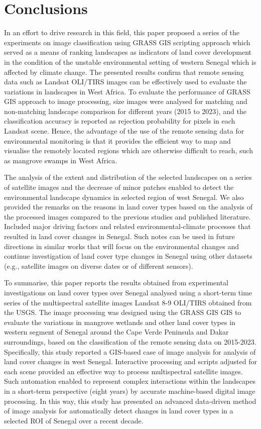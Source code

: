 \documentclass[earth,article,submit,pdftex,moreauthors]{Definitions/mdpi}
\begin{document}
\section{Conclusions}

In an effort to drive research in this field, this paper proposed a series of the experiments on image classification using GRASS GIS scripting approach which served as a means of ranking landscapes as indicators of land cover development in the condition of the unstable environmental setting of western Senegal which is affected by climate change. The presented results confirm that remote sensing data such as Landsat OLI/TIRS images can be effectively used to evaluate the variations in landscapes in West Africa. To evaluate the performance of GRASS GIS approach to image processing, size images were analysed for matching and non-matching landscape comparison for different years (2015 to 2023), and the classification accuracy is reported as rejection probability for pixels in each Landsat scene. Hence, the advantage of the use of the remote sensing data for environmental monitoring is that it provides the efficient way to map and visualise the remotely located regions which are otherwise difficult to reach, such as mangrove swamps in West Africa. 

The analysis of the extent and distribution of the selected landscapes on a series of satellite images and the decrease of minor patches enabled to detect the environmental landscape dynamics in selected region of west Senegal. We also provided the remarks on the reasons in land cover types based on the analysis of the processed images compared to the previous studies and published literature. Included major driving factors and related environmental-climate processes that resulted in land cover changes in Senegal. Such notes can be used in future directions in similar works that will focus on the environmental changes and continue investigation of land cover type changes in Senegal using other datasets (e.g., satellite images on diverse dates or of different sensors).

To summarise, this paper reports the results obtained from experimental investigations on land cover types over Senegal analysed using a short-term time series of the multispectral satellite images Landsat 8-9 OLI/TIRS obtained from the USGS. The image processing was designed using the GRASS GIS GIS to evaluate the variations in mangrove wetlands and other land cover types in western segment of Senegal around the Cape Verde Peninsula and Dakar surroundings, based on the classification of the remote sensing data on 2015-2023. Specifically, this study reported a GIS-based case of image analysis for analysis of land cover changes in west Senegal. Interactive processing and  scripts adjusted for each scene provided an effective way to process multispectral satellite images. Such automation enabled to represent complex interactions within the landscapes in a short-term perspective (eight years) by accurate machine-based digital image processing. In this way, this study has presented an advanced data-driven method of image analysis for automatically detect changes in land cover types in a selected ROI of Senegal over a recent decade.
\end{document}
